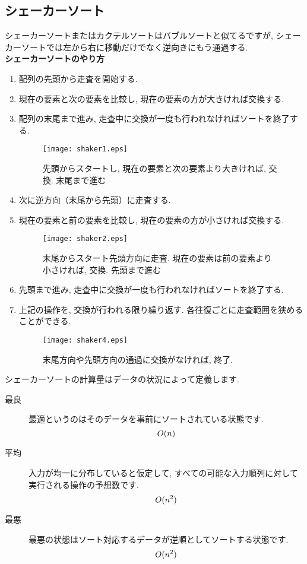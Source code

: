 \documentclass[a4j]{jarticle}
\begin{document}
\subsection{シェーカーソート}
シェーカーソートまたはカクテルソートはバブルソートと似てるですが, シェーカーソートでは左から右に移動だけでなく逆向きにもう通過する. \\
\textbf{シェーカーソートのやり方}
\begin{enumerate}
  \item 配列の先頭から走査を開始する. 
  \item 現在の要素と次の要素を比較し, 現在の要素の方が大きければ交換する. 
  \item 配列の末尾まで進み, 走査中に交換が一度も行われなければソートを終了する. 
  \begin{figure}[H]
    \centering
    \texttt{[image: shaker1.eps]}
    \caption{先頭からスタートし, 現在の要素と次の要素より大きければ, 交換. 末尾まで進む}
  \end{figure}
  \item 次に逆方向（末尾から先頭）に走査する. 
  \item 現在の要素と前の要素を比較し, 現在の要素の方が小さければ交換する. 
  \begin{figure}[H]
    \centering
    \texttt{[image: shaker2.eps]}
    \caption{末尾からスタート先頭方向に走査. 現在の要素は前の要素より小さければ, 交換. 先頭まで進む}
  \end{figure}
  \item 先頭まで進み, 走査中に交換が一度も行われなければソートを終了する. 
  \item 上記の操作を, 交換が行われる限り繰り返す. 各往復ごとに走査範囲を狭めることができる. 
  \begin{figure}[H]
    \centering
    \texttt{[image: shaker4.eps]}
    \caption{末尾方向や先頭方向の通過に交換がなければ, 終了. }
  \end{figure}
\end{enumerate}
\newpage
シェーカーソートの計算量はデータの状況によって定義します. \\
\begin{description}
  \item[最良] 最適というのはそのデータを事前にソートされている状態です. 
  \begin{equation}
    \centering
    O(n)
  \end{equation}
  \item[平均] 入力が均一に分布していると仮定して, すべての可能な入力順列に対して実行される操作の予想数です. 
  \begin{equation}
    \centering
    O(n^2)
  \end{equation}
  \item[最悪] 最悪の状態はソート対応するデータが逆順としてソートする状態です. 
  \begin{equation}
    \centering
    O(n^2)
  \end{equation}
\end{description}
\end{document}
